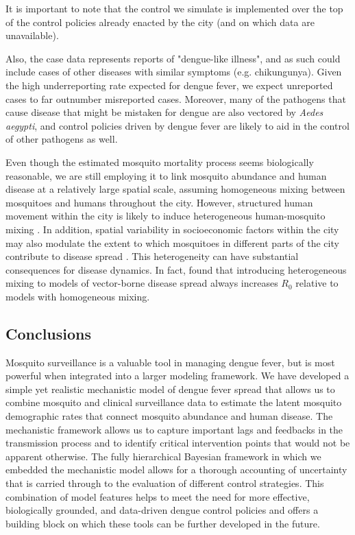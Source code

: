 \documentclass[10pt,letterpaper]{article}
\begin{document}
It is important to note that the control we simulate is implemented over the top of the control policies already enacted by the city (and on which data are unavailable).

Also, the case data represents reports of "dengue-like illness", and as such could include cases of other diseases with similar symptoms (e.g. chikungunya).
Given the high underreporting rate expected for dengue fever, we expect unreported cases to far outnumber misreported cases.
Moreover, many of the pathogens that cause disease that might be mistaken for dengue are also vectored by \emph{Aedes aegypti}, and control policies driven by dengue fever are likely to aid in the control of other pathogens as well.

Even though the estimated mosquito mortality process seems biologically reasonable, we are still employing it to link mosquito abundance and human disease at a relatively large spatial scale, assuming homogeneous mixing between mosquitoes and humans throughout the city.
However, structured human movement within the city is likely to induce heterogeneous human-mosquito mixing \cite{Adams2009, Cosner2009a, Stoddard2009}.
In addition, spatial variability in socioeconomic factors within the city may also modulate the extent to which mosquitoes in different parts of the city contribute to disease spread \cite{Mondini2008, Honorio2009, Hu2012, DeMattosAlmeida2007}.
This heterogeneity can have substantial consequences for disease dynamics.
In fact, \cite{Dye1986, Hasibeder1988} found that introducing heterogeneous mixing to models of vector-borne disease spread always increases $R_0$ relative to models with homogeneous mixing.

\subsection*{Conclusions}

Mosquito surveillance is a valuable tool in managing dengue fever, but is most powerful when integrated into a larger modeling framework.
We have developed a simple yet realistic mechanistic model of dengue fever spread that allows us to combine mosquito and clinical surveillance data to estimate the latent mosquito demographic rates that connect mosquito abundance and human disease.
The mechanistic framework allows us to capture important lags and feedbacks in the transmission process and to identify critical intervention points that would not be apparent otherwise.
The fully hierarchical Bayesian framework in which we embedded the mechanistic model allows for a thorough accounting of uncertainty that is carried through to the evaluation of different control strategies.
This combination of model features helps to meet the need for more effective, biologically grounded, and data-driven dengue control policies and offers a building block on which these tools can be further developed in the future.
\end{document}
